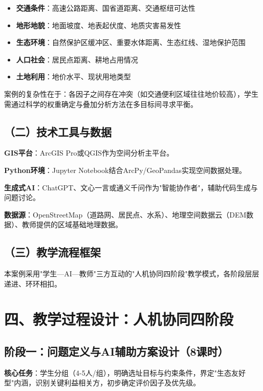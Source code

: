\documentclass[12pt, a4paper]{article}
\begin{document}
\begin{itemize}
\item \textbf{交通条件}：高速公路距离、国省道距离、交通枢纽可达性
\item \textbf{地形地貌}：地面坡度、地表起伏度、地质灾害易发性
\item \textbf{生态环境}：自然保护区缓冲区、重要水体距离、生态红线、湿地保护范围
\item \textbf{人口社会}：居民点距离、耕地占用情况
\item \textbf{土地利用}：地价水平、现状用地类型
\end{itemize}

案例的复杂性在于：各因子之间存在冲突（如交通便利区域往往地价较高），学生需通过科学的权重确定与叠加分析方法在多目标间寻求平衡。

\subsection{（二）技术工具与数据}

\textbf{GIS平台}：ArcGIS Pro或QGIS作为空间分析主平台。

\textbf{Python环境}：Jupyter Notebook结合ArcPy/GeoPandas实现空间数据处理。

\textbf{生成式AI}：ChatGPT、文心一言或通义千问作为"智能协作者"，辅助代码生成与问题讨论。

\textbf{数据源}：OpenStreetMap（道路网、居民点、水系）、地理空间数据云（DEM数据）、教师提供的区域基础地理数据。

\subsection{（三）教学流程框架}

本案例采用"学生—AI—教师"三方互动的"人机协同四阶段"教学模式，各阶段层层递进、环环相扣。

\newpage

\section{四、教学过程设计：人机协同四阶段}

\subsection{阶段一：问题定义与AI辅助方案设计（8课时）}

\textbf{核心任务}：学生分组（4-5人/组），明确选址目标与约束条件，界定"生态友好型"内涵，识别关键利益相关方，初步确定评价因子及优先级。
\end{document}
